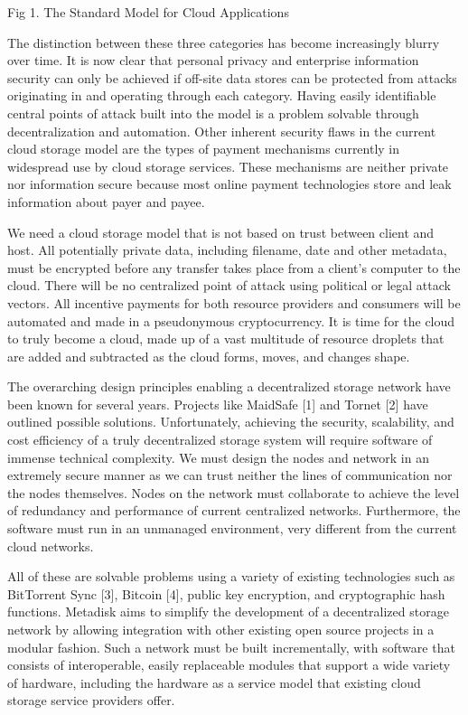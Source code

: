 \documentclass[a4paper,12pt]{article}
\begin{document}
Fig 1. The Standard Model for Cloud Applications 

The distinction between these three categories has become increasingly blurry over time. It is now clear that personal privacy and enterprise information security can only be achieved if off-site data stores can be protected from attacks originating in and operating through each category.  Having easily identifiable central points of attack built into the model is a problem solvable through decentralization and automation. Other inherent security flaws in the current cloud storage model are the types of payment mechanisms currently in widespread use by cloud storage services. These mechanisms are neither private nor information secure because most online payment technologies store and leak information about payer and payee.

We need a cloud storage model that is not based on trust between client and host.  All potentially private data, including filename, date and other metadata, must be encrypted before any transfer takes place from a client’s computer to the cloud.  There will be no centralized point of attack using political or legal attack vectors.  All incentive payments for both resource providers and consumers will be  automated and made in a pseudonymous cryptocurrency.  It is time for the cloud to truly become a cloud, made up of a vast multitude of resource droplets that are added and subtracted as the cloud forms, moves, and changes shape.

The overarching design principles enabling a decentralized storage network have been known for several years. Projects like MaidSafe [1] and Tornet [2] have outlined possible solutions. Unfortunately, achieving the security, scalability, and cost efficiency of a truly decentralized storage system will require software of immense technical complexity. We must design the nodes and network in an extremely secure manner as we can trust neither the lines of communication nor the nodes themselves. Nodes on the network must collaborate to achieve the level of redundancy and performance of current centralized networks. Furthermore, the software must run in an unmanaged environment, very different from the current cloud networks.   

All of these are solvable problems using a variety of existing technologies such as BitTorrent Sync [3], Bitcoin [4], public key encryption, and cryptographic hash functions.  Metadisk aims to simplify the development of a decentralized storage network by allowing integration with other existing open source projects in a modular fashion.  Such a network must be built incrementally, with software that consists of interoperable, easily replaceable modules that support a wide variety of hardware, including the hardware as a service model that existing cloud storage service providers offer. 
\end{document}
